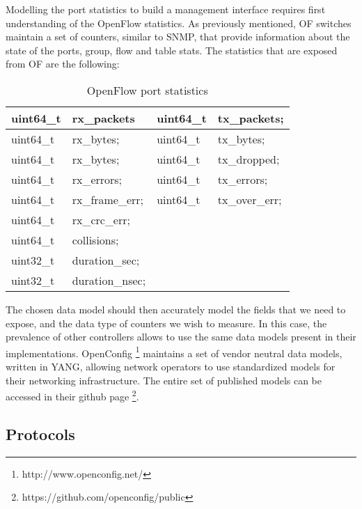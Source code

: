 \par Modelling the port statistics to build a management interface requires first understanding of the OpenFlow statistics. As previously mentioned, OF switches maintain a set of counters, similar to SNMP, that provide information 
about the state of the ports, group, flow and table stats. The statistics that are exposed from OF are the following:

\begin{table}[]
    \centering
    \caption{OpenFlow port statistics}
    \label{my-label}
    \begin{tabular}{l | l || l | l}
       uint64\_t & rx\_packets     & uint64\_t & tx\_packets;     \\ \hline
       uint64\_t & rx\_bytes;      & uint64\_t & tx\_bytes;       \\ \hline
       uint64\_t & rx\_bytes;      & uint64\_t & tx\_dropped;     \\ \hline
       uint64\_t & rx\_errors;     & uint64\_t & tx\_errors;      \\ \hline
       uint64\_t & rx\_frame\_err; & uint64\_t & tx\_over\_err;   \\ \hline
       uint64\_t & rx\_crc\_err;   &                              \\ \hline
       uint64\_t & collisions;     &                              \\ \hline
       uint32\_t & duration\_sec;  &                              \\ \hline
       uint32\_t & duration\_nsec; &                 
    \end{tabular}
\end{table}

\par The chosen data model should then accurately model the fields that we need to expose, and the data type of counters we wish to measure. In this case, the prevalence of other controllers allows to use the same data models present 
in their implementations. OpenConfig \footnote{http://www.openconfig.net/} maintains a set of vendor neutral data models, written in YANG, allowing network operators to use standardized models for their networking infrastructure.
The entire set of published models can be accessed in their github page \footnote {https://github.com/openconfig/public}.

\subsection {Protocols}


